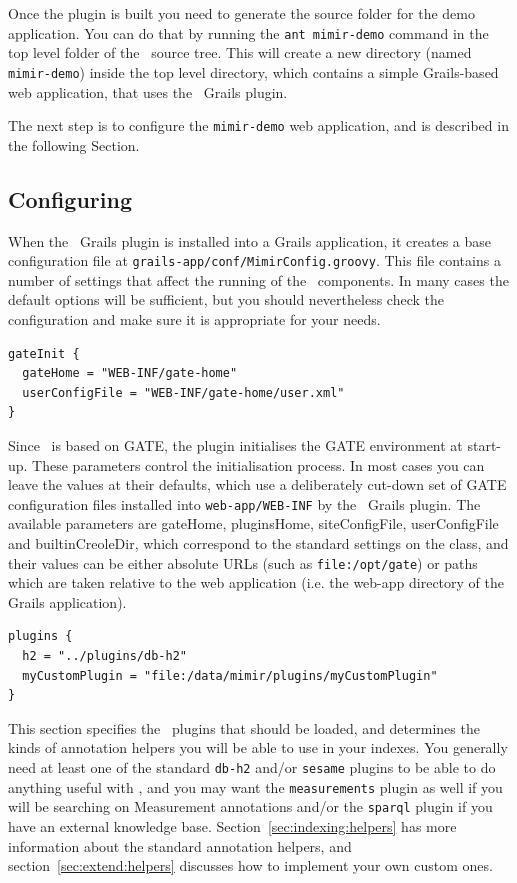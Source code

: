 Once the plugin is built you need to generate the source folder for the demo
application. You can do that by running the {\tt ant mimir-demo} command in the
top level folder of the \Mimir\ source tree. This will create a new directory
(named {\tt mimir-demo}) inside the top level directory, which contains a simple
Grails-based web application, that uses the \Mimir\ Grails plugin.

The next step is to configure the {\tt mimir-demo} web application, and is
described in the following Section.

\subsection{Configuring}\label{sec:admin:config}

When the \Mimir\ Grails plugin is installed into a Grails application, it
creates a base configuration file at {\tt grails-app/conf/MimirConfig.groovy}.
This file contains a number of settings that affect the running of the \Mimir\
components. In many cases the default options will be sufficient, but you should
nevertheless check the configuration and make sure it is appropriate for your
needs.

\begin{lstlisting}
gateInit {
  gateHome = "WEB-INF/gate-home"
  userConfigFile = "WEB-INF/gate-home/user.xml"
}
\end{lstlisting}

Since \Mimir\ is based on GATE, the plugin initialises the GATE environment at
start-up.  These parameters control the initialisation process.  In most cases
you can leave the values at their defaults, which use a deliberately cut-down
set of GATE configuration files installed into {\tt web-app/WEB-INF} by the
\Mimir\ Grails plugin.  The available parameters are gateHome, pluginsHome,
siteConfigFile, userConfigFile and builtinCreoleDir, which correspond to the
standard settings on the
class, and their values can be either absolute URLs (such as
\verb|file:/opt/gate|) or paths which are taken relative to the web application
(i.e. the web-app directory of the Grails application).

\begin{lstlisting}
plugins {
  h2 = "../plugins/db-h2"
  myCustomPlugin = "file:/data/mimir/plugins/myCustomPlugin"
}
\end{lstlisting}

This section specifies the \Mimir\ plugins that should be loaded, and
determines the kinds of annotation helpers you will be able to use in your
indexes.  You generally need at least one of the standard {\tt db-h2} and/or
{\tt sesame} plugins to be able to do anything useful with \Mimir, and you may
want the {\tt measurements} plugin as well if you will be searching on
Measurement annotations and/or the {\tt sparql} plugin if you have an external
knowledge base.  Section~\ref{sec:indexing:helpers} has more information about
the standard annotation helpers, and section~\ref{sec:extend:helpers} discusses
how to implement your own custom ones.


